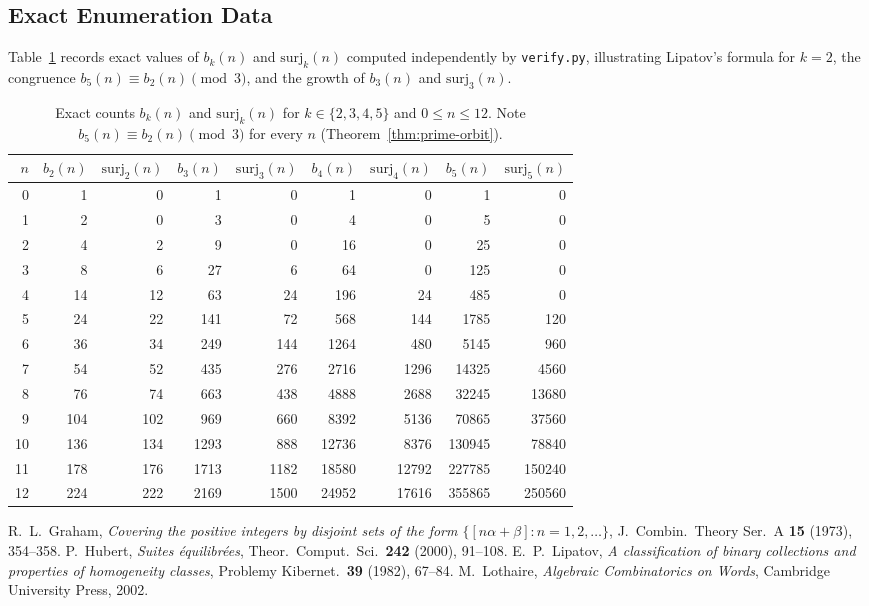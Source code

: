 \documentclass[11pt,a4paper]{article}
\theoremstyle{definition}
\newcommand{\surj}{\mathrm{surj}}
\begin{document}
\subsection{Exact Enumeration Data}
Table~\ref{tab:counts} records exact values of $b_k(n)$ and $\surj_k(n)$ computed independently by \texttt{verify.py}, illustrating Lipatov's formula for $k = 2$, the congruence $b_5(n) \equiv b_2(n) \pmod 3$, and the growth of $b_3(n)$ and $\surj_3(n)$.

\begin{table}[htbp]
\centering
\small
\begin{tabular}{@{}rrrrrrrrr@{}}
\hline
$n$ & $b_2(n)$ & $\surj_2(n)$ & $b_3(n)$ & $\surj_3(n)$ & $b_4(n)$ & $\surj_4(n)$ & $b_5(n)$ & $\surj_5(n)$ \\
\hline
 0 & 1 & 0 & 1 & 0 & 1 & 0 & 1 & 0 \\
 1 & 2 & 0 & 3 & 0 & 4 & 0 & 5 & 0 \\
 2 & 4 & 2 & 9 & 0 & 16 & 0 & 25 & 0 \\
 3 & 8 & 6 & 27 & 6 & 64 & 0 & 125 & 0 \\
 4 & 14 & 12 & 63 & 24 & 196 & 24 & 485 & 0 \\
 5 & 24 & 22 & 141 & 72 & 568 & 144 & 1785 & 120 \\
 6 & 36 & 34 & 249 & 144 & 1264 & 480 & 5145 & 960 \\
 7 & 54 & 52 & 435 & 276 & 2716 & 1296 & 14325 & 4560 \\
 8 & 76 & 74 & 663 & 438 & 4888 & 2688 & 32245 & 13680 \\
 9 & 104 & 102 & 969 & 660 & 8392 & 5136 & 70865 & 37560 \\
10 & 136 & 134 & 1293 & 888 & 12736 & 8376 & 130945 & 78840 \\
11 & 178 & 176 & 1713 & 1182 & 18580 & 12792 & 227785 & 150240 \\
12 & 224 & 222 & 2169 & 1500 & 24952 & 17616 & 355865 & 250560 \\
\hline
\end{tabular}
\caption{Exact counts $b_k(n)$ and $\surj_k(n)$ for $k \in \{2, 3, 4, 5\}$ and $0 \le n \le 12$. Note $b_5(n) \equiv b_2(n) \pmod 3$ for every $n$ (Theorem~\ref{thm:prime-orbit}).}
\label{tab:counts}
\end{table}

\begin{thebibliography}{9}
   R.~L.~Graham, \emph{Covering the positive integers by disjoint sets of the form $\{[n\alpha + \beta] : n = 1, 2, \dots\}$}, J.\ Combin.\ Theory Ser.\ A \textbf{15} (1973), 354--358.
   P.~Hubert, \emph{Suites \'equilibr\'ees}, Theor.\ Comput.\ Sci.\ \textbf{242} (2000), 91--108.
   E.~P.~Lipatov, \emph{A classification of binary collections and properties of homogeneity classes}, Problemy Kibernet.\ \textbf{39} (1982), 67--84.
   M.~Lothaire, \emph{Algebraic Combinatorics on Words}, Cambridge University Press, 2002.
\end{thebibliography}
\end{document}
